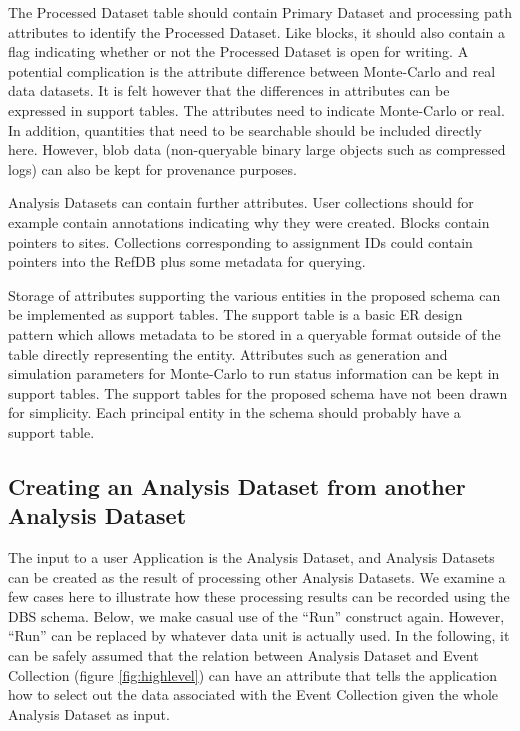 \documentclass{cmspaper}
\begin{document}
The Processed Dataset table should contain Primary Dataset and processing path 
attributes to identify the Processed Dataset.  
Like blocks, it should also contain a flag indicating whether or not the Processed Dataset 
is open for writing.  A potential complication is the attribute 
difference between Monte-Carlo and real data 
datasets.  It is felt however that the differences in attributes can be expressed in support 
tables.  The attributes need to indicate Monte-Carlo or real.  In 
addition, quantities that need to be searchable should be included directly here.  However, 
blob data (non-queryable binary large objects such as compressed logs) can also be kept for provenance 
purposes.  

Analysis Datasets can contain further attributes.  User collections should for 
example contain annotations indicating why they were created.  Blocks contain 
pointers to sites.  Collections corresponding to assignment IDs could contain pointers 
into the RefDB plus some metadata for querying.

Storage of attributes supporting the various 
entities in the proposed schema can be implemented as support tables.  The support table 
is a basic ER design pattern which allows metadata to be stored in a queryable format 
outside of the table directly representing the entity.  Attributes such as generation and 
simulation parameters for Monte-Carlo to run status information can be kept in support 
tables.   The support tables for the proposed schema have not been drawn for simplicity.  
Each principal entity in the schema should probably have a support table.

\subsection{Creating an Analysis Dataset from another Analysis Dataset}
\label{sec:createEvColl}

The input to a user Application is the Analysis Dataset, and Analysis Datasets can be 
created as the result of processing other Analysis Datasets.  We examine a few cases 
here to illustrate how these processing results can be recorded using the DBS schema.
Below, we make casual use of the ``Run'' construct again.  However, ``Run'' can be replaced
by whatever data unit is actually used.  In the following,
it can be safely assumed that the relation between Analysis Dataset and Event Collection 
(figure \ref{fig:highlevel}) can have an attribute that tells the application how to select 
out the data associated with the Event Collection given the whole Analysis Dataset as
input.  
\end{document}
